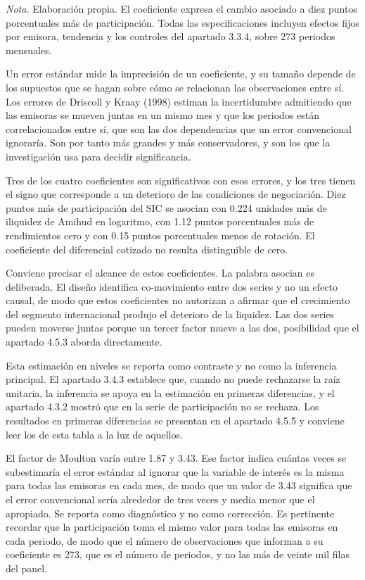 \emph{Nota.} Elaboración propia. El coeficiente expresa el cambio asociado a diez puntos porcentuales más de participación.  Todas las especificaciones incluyen efectos fijos por emisora, tendencia y los controles del apartado 3.3.4, sobre 273 periodos mensuales.

Un error estándar mide la imprecisión de un coeficiente, y su tamaño depende de los supuestos que se hagan sobre cómo se relacionan las observaciones entre sí. Los errores de Driscoll y Kraay (1998) estiman la incertidumbre admitiendo que las emisoras se mueven juntas en un mismo mes y que los periodos están correlacionados entre sí, que son las dos dependencias que un error convencional ignoraría. Son por tanto más grandes y más conservadores, y son los que la investigación usa para decidir significancia.

Tres de los cuatro coeficientes son significativos con esos errores, y los tres tienen el signo que corresponde a un deterioro de las condiciones de negociación. Diez puntos más de participación del SIC se asocian con 0.224 unidades más de iliquidez de Amihud en logaritmo, con 1.12 puntos porcentuales más de rendimientos cero y con 0.15 puntos porcentuales menos de rotación. El coeficiente del diferencial cotizado no resulta distinguible de cero.

Conviene precisar el alcance de estos coeficientes. La palabra asocian es deliberada. El diseño identifica co-movimiento entre dos series y no un efecto causal, de modo que estos coeficientes no autorizan a afirmar que el crecimiento del segmento internacional produjo el deterioro de la liquidez. Las dos series pueden moverse juntas porque un tercer factor mueve a las dos, posibilidad que el apartado 4.5.3 aborda directamente.

Esta estimación en niveles se reporta como contraste y no como la inferencia principal. El apartado 3.4.3 establece que, cuando no puede rechazarse la raíz unitaria, la inferencia se apoya en la estimación en primeras diferencias, y el apartado 4.3.2 mostró que en la serie de participación no se rechaza. Los resultados en primeras diferencias se presentan en el apartado 4.5.5 y conviene leer los de esta tabla a la luz de aquellos.

El factor de Moulton varía entre 1.87 y 3.43. Ese factor indica cuántas veces se subestimaría el error estándar al ignorar que la variable de interés es la misma para todas las emisoras en cada mes, de modo que un valor de 3.43 significa que el error convencional sería alrededor de tres veces y media menor que el apropiado. Se reporta como diagnóstico y no como corrección. Es pertinente recordar que la participación toma el mismo valor para todas las emisoras en cada periodo, de modo que el número de observaciones que informan a su coeficiente es 273, que es el número de periodos, y no las más de veinte mil filas del panel.

